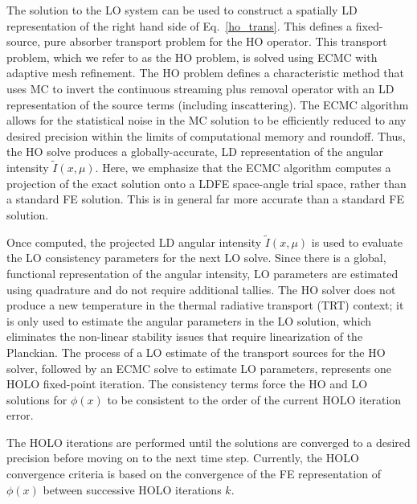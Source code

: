 \documentclass{mc2013}
\begin{document}
The solution to the LO system can be used to construct a spatially LD representation of the right
hand side of Eq.~\eqref{ho_trans}.  This defines a fixed-source, pure absorber
transport problem for the HO operator.  This transport problem, which we refer to as the HO problem, is solved using ECMC with adaptive mesh
refinement.  The HO problem defines a characteristic method that uses MC to
invert the continuous streaming plus removal operator with an LD representation of
the source terms (including inscattering).  The ECMC algorithm allows for the statistical noise in the MC
solution to be efficiently reduced to any desired precision within the limits of computational memory and
roundoff.  Thus, the HO solve produces a
globally-accurate, LD representation of the angular intensity
$\tilde{I}(x,\mu)$.  Here, we emphasize that the ECMC algorithm computes a
projection of the exact solution onto a LDFE space-angle trial space, rather than a
standard FE solution.  This is in general far
more accurate than a standard FE solution. 

Once computed, the projected LD
angular intensity $\tilde{I}(x,\mu)$ is used to evaluate the LO
consistency parameters for the next LO solve.  Since there is a global, functional representation of
the angular intensity,  LO parameters are estimated using quadrature and do not require additional tallies.  The HO solver does not
produce a new temperature in the thermal radiative transport (TRT) context; it is
only used to estimate the angular parameters in the LO solution, which eliminates
the non-linear stability issues that require linearization of the Planckian.
The process of a LO estimate of the transport sources for the HO solver, followed by
an ECMC
solve to estimate LO parameters, represents one HOLO fixed-point iteration.
The consistency terms force the HO
and LO solutions for $\phi(x)$ to be consistent to the order of the current HOLO
iteration error.  

The HOLO iterations are performed until the solutions are converged to a
desired precision before moving on to the next time step. Currently, the HOLO convergence criteria is based on
the convergence of the FE representation of $\phi(x)$ between successive HOLO iterations
$k$.  
\end{document}
